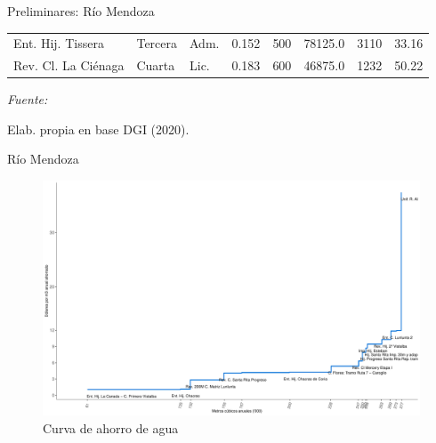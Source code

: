 \documentclass{beamer}\usepackage[]{graphicx}\usepackage[]{color}
\makeatletter
\def\maxwidth{ %
  \ifdim\Gin@nat@width>\linewidth
    \linewidth
  \else
    \Gin@nat@width
  \fi
}
\makeatother
\begin{document}
\begin{frame}{Preliminares: Río Mendoza}
\begin{table}[H]
{\begin{threeparttable}
\begin{tabular}{lllrrrrr}
\hspace{1em}Ent. Hij. Tissera & Tercera & Adm. & 0.152 & 500 & 78125.0 & 3110 & 33.16\\
\hspace{1em}Rev. Cl. La Ciénaga & Cuarta & Lic. & 0.183 & 600 & 46875.0 & 1232 & 50.22\\
\bottomrule
\end{tabular}
\begin{tablenotes}[para]
\item \textit{Fuente: } 
\item Elab. propia en base DGI (2020).
\end{tablenotes}
\end{threeparttable}}
\endgroup{}
\end{table}


\end{frame}

\begin{frame}{Río Mendoza}
\begin{figure}

{\centering \includegraphics[width=\maxwidth,]{figure/AhorroMzaPerd-1} 

}

\caption[\label{AhorroMzaPerd}Curva de ahorro de agua]{\label{AhorroMzaPerd}Curva de ahorro de agua}\label{fig:AhorroMzaPerd}
\end{figure}


\end{frame}
\end{document}
